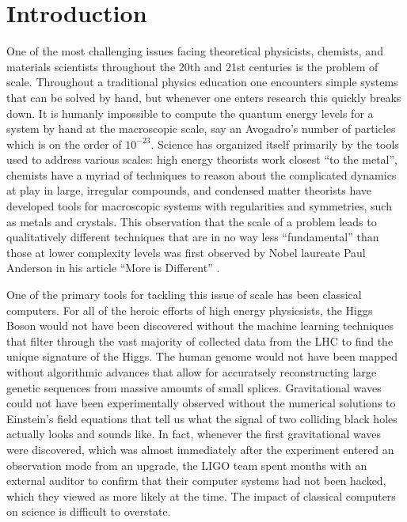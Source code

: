 \chapter{Introduction}

One of the most challenging issues facing theoretical physicists, chemists, and materials scientists throughout the 20th and 21st centuries is the problem of scale. Throughout a traditional physics education one encounters simple systems that can be solved by hand, but whenever one enters research this quickly breaks down. It is humanly impossible to compute the quantum energy levels for a system by hand at the macroscopic scale, say an Avogadro's number of particles which is on the order of $10^{-23}$. Science has organized itself primarily by the tools used to address various scales: high energy theorists work closest ``to the metal'', chemists have a myriad of techniques to reason about the complicated dynamics at play in large, irregular compounds, and condensed matter theorists have developed tools for macroscopic systems with regularities and symmetries, such as metals and crystals. This observation that the scale of a problem leads to qualitatively different techniques that are in no way less ``fundamental'' than those at lower complexity levels was first observed by Nobel laureate Paul Anderson in his article ``More is Different'' \cite{moreIsDifferent}.

One of the primary tools for tackling this issue of scale has been classical computers. For all of the heroic efforts of high energy physicsists, the Higgs Boson would not have been discovered without the machine learning techniques that filter through the vast majority of collected data from the LHC to find the unique signature of the Higgs. The human genome would not have been mapped without algorithmic advances that allow for accuratsely reconstructing large genetic sequences from massive amounts of small splices. Gravitational waves could not have been experimentally observed without the numerical solutions to Einstein's field equations that tell us what the signal of two colliding black holes actually looks and sounds like. In fact, whenever the first gravitational waves were discovered, which was almost immediately after the experiment entered an observation mode from an upgrade, the LIGO team spent months with an external auditor to confirm that their computer systems had not been hacked, which they viewed as more likely at the time. The impact of classical computers on science is difficult to overstate. 

